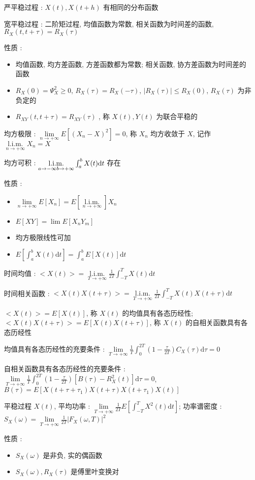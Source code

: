 \documentclass[UTF8, 12pt]{ctexart}
\DeclareMathOperator*{\Lim}{l.i.m.} %
\begin{document}
	严平稳过程 : $ X(t), X(t+h) $ 有相同的分布函数

	宽平稳过程 : 二阶矩过程, 均值函数为常数, 相关函数为时间差的函数, $ R_{X}(t, t+\tau) = R_{X}(\tau) $

	性质 :
	\begin{itemize}[leftmargin = 4em]
		\item 均值函数, 均方差函数, 方差函数都为常数; 相关函数, 协方差函数为时间差的函数
		\item $ R_{X}(0) = \Psi_{X}^{2} \geq 0 $, $ R_{X}(\tau) = R_{X}(-\tau) $, $ |R_{X}(\tau)| \leq R_{X}(0) $, $ R_{X}(\tau) $ 为非负定的
		\item $ R_{XY}(t, t+\tau) = R_{XY}(\tau) $ , 称 $ X(t), Y(t) $ 为联合平稳的
	\end{itemize}

	均方极限 : $ \lim\limits_{n\to+\infty}E[(X_{n}-X)^{2}] = 0 $, 称 $ X_{n} $ 均方收敛于 $ X $, 记作 $ \Lim\limits_{n\to+\infty}X_{n} = X $

	均方可积 : $ \Lim\limits_{a\to-\infty\\b\to+\infty}\int_{a}^{b}X(t)\mathrm{d}t $ 存在

	性质 :
	\begin{itemize}[leftmargin = 4em]
		\item $ \lim\limits_{n\to+\infty}E[X_{n}] = E[\Lim\limits_{n\to+\infty}]X_{n} $
		\item $ E[XY] = \lim E[X_{n}Y_{m}] $
		\item 均方极限线性可加
		\item $ E[\int_{a}^{b}X(t)\mathrm{d}t] = \int_{a}^{b}E[X(t)]\mathrm{d}t $
	\end{itemize}

	时间均值 : $ <X(t)> = \Lim\limits_{T\to+\infty}\frac{1}{2T}\int_{-T}^{T}X(t)\mathrm{d}t $

	时间相关函数 : $ <X(t)X(t+\tau)> = \Lim\limits_{T\to+\infty}\frac{1}{2T}\int_{-T}^{T}X(t)X(t+\tau)\mathrm{d}t $ 

	$ <X(t)> = E[X(t)] $, 称 $ X(t) $ 的均值具有各态历经性; $ <X(t)X(t+\tau)> = E[X(t)X(t+\tau)] $, 称 $ X(t) $ 的自相关函数具有各态历经性

	均值具有各态历经性的充要条件 : $ \lim\limits_{T\to+\infty}\frac{1}{T}\int_{0}^{2T}(1-\frac{\tau}{2T})C_{X}(\tau)\mathrm{d}\tau = 0 $

	自相关函数具有各态历经性的充要条件 : $ \lim\limits_{T\to+\infty}\frac{1}{T}\int_{0}^{2T}(1-\frac{\tau}{2T})[B(\tau)-R_{X}^{2}(t)]\mathrm{d}\tau = 0 $, $ B(\tau) = E[X(t+\tau+\tau_{1})X(t+\tau)X(t+\tau_{1})X(t)] $

	平稳过程 $ X(t) $, 平均功率 : $ \lim\limits_{T\to+\infty}\frac{1}{2T}E[\int_{-T}^{T}X^{2}(t)\mathrm{d}t] $; 功率谱密度 : $ S_{X}(\omega) = \lim\limits_{T\to+\infty}\frac{1}{2T}|F_{X}(\omega, T)|^{2} $

	性质 :
	\begin{itemize}[leftmargin = 4em]
		\item $ S_{X}(\omega) $ 是非负, 实的偶函数
		\item $ S_{X}(\omega), R_{X}(\tau)$ 是傅里叶变换对
	\end{itemize}
\end{document}
